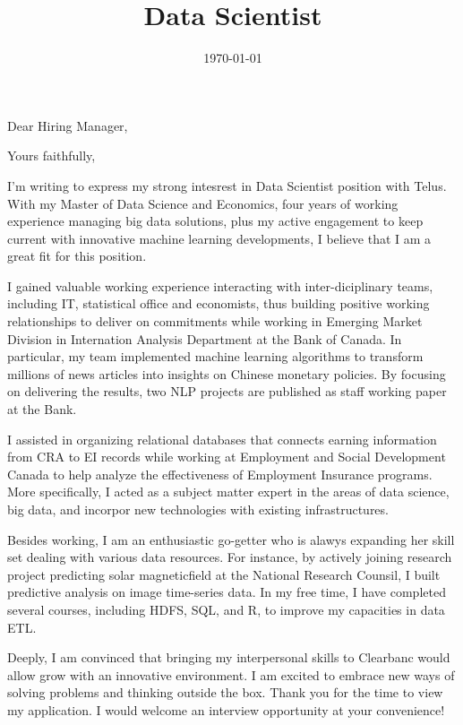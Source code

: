 \documentclass[12pt,a4paper,roman]{moderncv}        %
\title{Data Scientist\vspace*{15pt}}                               %
\begin{document}

\date{\today}
\opening{Dear Hiring Manager,}
\closing{Yours faithfully,}

\makelettertitle

I'm writing to express my strong intesrest in Data Scientist position with Telus. With my Master of Data Science and Economics, four years of working experience managing big data solutions, plus my active engagement to keep current with innovative machine learning developments, I believe that I am a great fit for this position. 
\bigskip

I gained valuable working experience interacting with inter-diciplinary teams, including IT, statistical office and economists, thus building positive working relationships to deliver on commitments while working in Emerging Market Division in Internation Analysis Department at the Bank of Canada. In particular, my team implemented machine learning algorithms to transform millions of news articles into insights on Chinese monetary policies. By focusing on delivering the results, two NLP projects are published as staff working paper at the Bank.  
\bigskip

I assisted in organizing relational databases that connects earning information from CRA to EI records while working at Employment and Social Development Canada to help analyze the effectiveness of Employment Insurance programs. More specifically, I acted as a subject matter expert in the areas of data science, big data, and incorpor new technologies with existing infrastructures. 
\bigskip 

Besides working, I am an enthusiastic go-getter who is alawys expanding her skill set dealing with various data resources. For instance, by actively joining research project predicting solar magneticfield at the National Research Counsil, I built predictive analysis on image time-series data. In my free time, I have completed several courses, including HDFS, SQL, and R, to improve my capacities in data ETL. 
\bigskip

Deeply, I am convinced that bringing my interpersonal skills to Clearbanc would allow grow with an innovative environment. I am excited to embrace new ways of solving problems and thinking outside the box. Thank you for the time to view my application. I would welcome an interview opportunity at your convenience!
\bigskip

\makeletterclosing
\end{document}
